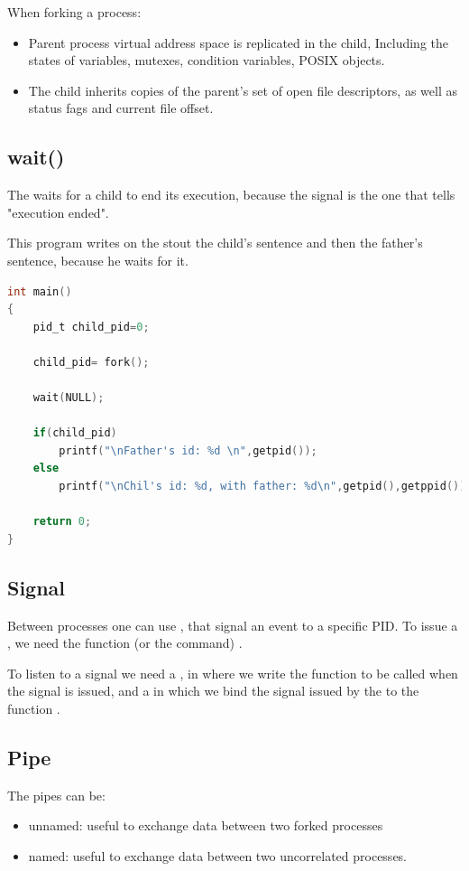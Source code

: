 When forking a process:
\begin{itemize}
	\item Parent process virtual address space is replicated in the child, Including the states of variables, mutexes, condition variables, POSIX objects.
	\item The child inherits copies of the parent's set of open file descriptors, as well as status fags and current file offset.
\end{itemize}

\subsection{wait()}
The  waits for a child to end its execution, because the signal  is the one that tells "execution ended". 

This program writes on the stout the child's sentence and then the father's sentence, because he waits for it.
\begin{lstlisting}[language=C]
int main()
{
	pid_t child_pid=0;
	
	child_pid= fork();
	
	wait(NULL);
	
	if(child_pid)
		printf("\nFather's id: %d \n",getpid());
	else
		printf("\nChil's id: %d, with father: %d\n",getpid(),getppid());

	return 0;
}

\end{lstlisting}

\subsection{Signal}
Between processes one can use , that signal an event to a specific PID.
To issue a , we need the function (or the command) .

To listen to a signal we need a , in where we write the function to be called when the signal is issued, and a  in which we bind the signal issued by the  to the function .


\subsection{Pipe}
The pipes can be:
\begin{itemize}
	\item unnamed: useful to exchange data between two forked processes
	\item named: useful to exchange data between two uncorrelated processes. 
\end{itemize}

